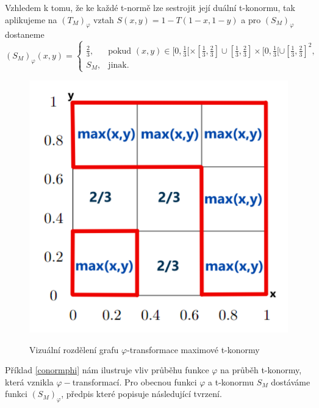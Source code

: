 \begin{example}
    \label{conormphi}
    Vzhledem k tomu, \v ze ke ka\v zd\'e t-norm\v e lze sestrojit jej\'i du\'aln\'i t-konormu, tak aplikujeme na $\left(T_M\right)_\varphi$ vztah $S(x,y)=1-T(1-x,1-y)$ a pro $\left(S_M\right)_\varphi$ dostaneme
 $$(S_M)_\varphi(x,y) = \begin{cases} \frac{2}{3}, & \mbox {pokud } (x,y) \in [0,\frac{1}{3}[\times[\frac{1}{3},\frac{2}{3}] \cup [\frac{1}{3},\frac{2}{3}]\times[0,\frac{1}{3}[ \cup [\frac{1}{3},\frac{2}{3}]^2,
    \\ S_M, & \mbox {jinak. }
    \end{cases}$$

\begin{figure}[H]
\caption{ Vizu\' aln\' i rozd\v elen\'i grafu $\varphi$-transformace maximové t-konormy}
\centering
\includegraphics[scale=0.8]{template-fig/phi-t-conorm.pdf}
    \label{graph: max-conorm}
\end{figure}

\end{example}
Příklad \ref{conormphi} nám ilustruje vliv průběhu funkce $\varphi$ na průběh t-konormy, která vznikla $\varphi-$transformací. Pro obecnou funkci $\varphi$ a t-konormu $S_M$ dostáváme funkci $(S_M)_{\varphi}$, předpis které popisuje následující tvrzení.

